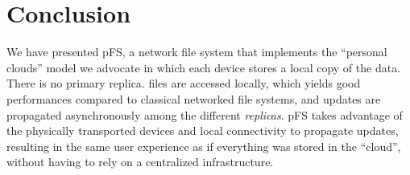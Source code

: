 
\section{Conclusion}
\label{sec:conc}

We have presented pFS, a network file system that implements the
``personal clouds'' model we advocate in which each device stores a
local copy of the data. There is no primary replica. files
are accessed locally, which yields good performances compared to
classical networked file systems, and updates are propagated
asynchronously among the different \emph{replicas}. pFS takes
advantage of the physically transported devices and local connectivity
to propagate updates, resulting in the same user experience as if
everything was stored in the ``cloud'', without having to rely on a
centralized infrastructure.

